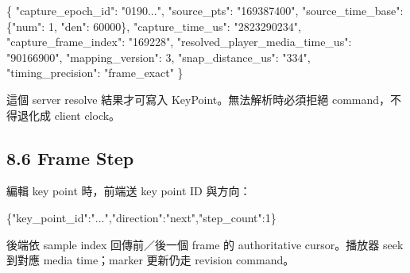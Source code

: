\documentclass[
  9pt,
  a4paper,
]{article}
\newenvironment{Shaded}{}{}
\newcommand{\DataTypeTok}[1]{\textcolor[rgb]{0.56,0.13,0.00}{#1}}
\newcommand{\DecValTok}[1]{\textcolor[rgb]{0.25,0.63,0.44}{#1}}
\newcommand{\FunctionTok}[1]{\textcolor[rgb]{0.02,0.16,0.49}{#1}}
\newcommand{\StringTok}[1]{\textcolor[rgb]{0.25,0.44,0.63}{#1}}
\begin{document}
\begin{Shaded}
\begin{Highlighting}[]
\FunctionTok{\{}
  \DataTypeTok{"capture\_\allowbreak{}epoch\_\allowbreak{}id"}\FunctionTok{:} \StringTok{"0190..."}\FunctionTok{,}
  \DataTypeTok{"source\_\allowbreak{}pts"}\FunctionTok{:} \StringTok{"169387400"}\FunctionTok{,}
  \DataTypeTok{"source\_\allowbreak{}time\_\allowbreak{}base"}\FunctionTok{:} \FunctionTok{\{}\DataTypeTok{"num"}\FunctionTok{:} \DecValTok{1}\FunctionTok{,} \DataTypeTok{"den"}\FunctionTok{:} \DecValTok{60000}\FunctionTok{\},}
  \DataTypeTok{"capture\_\allowbreak{}time\_\allowbreak{}us"}\FunctionTok{:} \StringTok{"2823290234"}\FunctionTok{,}
  \DataTypeTok{"capture\_\allowbreak{}frame\_\allowbreak{}index"}\FunctionTok{:} \StringTok{"169228"}\FunctionTok{,}
  \DataTypeTok{"resolved\_\allowbreak{}player\_\allowbreak{}media\_\allowbreak{}time\_\allowbreak{}us"}\FunctionTok{:} \StringTok{"90166900"}\FunctionTok{,}
  \DataTypeTok{"mapping\_\allowbreak{}version"}\FunctionTok{:} \DecValTok{3}\FunctionTok{,}
  \DataTypeTok{"snap\_\allowbreak{}distance\_\allowbreak{}us"}\FunctionTok{:} \StringTok{"334"}\FunctionTok{,}
  \DataTypeTok{"timing\_\allowbreak{}precision"}\FunctionTok{:} \StringTok{"frame\_\allowbreak{}exact"}
\FunctionTok{\}}
\end{Highlighting}
\end{Shaded}

這個 server resolve 結果才可寫入 KeyPoint。無法解析時必須拒絕
command，不得退化成 client clock。

\subsection{8.6 Frame Step}\label{86-frame-step}

編輯 key point 時，前端送 key point ID 與方向：

\begin{Shaded}
\begin{Highlighting}[]
\FunctionTok{\{}\DataTypeTok{"key\_\allowbreak{}point\_\allowbreak{}id"}\FunctionTok{:}\StringTok{"..."}\FunctionTok{,}\DataTypeTok{"direction"}\FunctionTok{:}\StringTok{"next"}\FunctionTok{,}\DataTypeTok{"step\_\allowbreak{}count"}\FunctionTok{:}\DecValTok{1}\FunctionTok{\}}
\end{Highlighting}
\end{Shaded}

後端依 sample index 回傳前／後一個 frame 的 authoritative cursor。播放器
seek 到對應 media time；marker 更新仍走 revision command。
\end{document}
